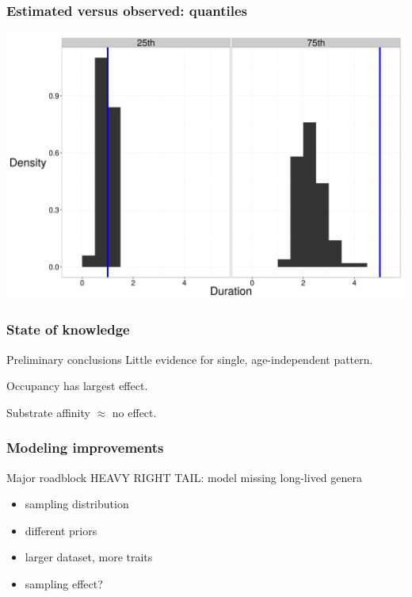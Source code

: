 \documentclass{beamer}
\begin{document}
\begin{frame}
  \frametitle{Estimated versus observed: quantiles}
  \begin{center}
    \includegraphics[height = 0.8\textheight, width = \textwidth, keepaspectratio = true]{figure/wei_quant_ppc}
  \end{center}
\end{frame}

\begin{frame}
  \frametitle{State of knowledge}

  \begin{block}{Preliminary conclusions}
    Little evidence for single, age-independent pattern.

    Occupancy has largest effect. 
    
    Substrate affinity \(\approx\) no effect.
  \end{block}
\end{frame}

\begin{frame}
  \frametitle{Modeling improvements}

  \begin{alertblock}{Major roadblock}
    \alert{\uppercase{heavy right tail}}: model missing long-lived genera
  \end{alertblock}

  \bigskip

  \begin{itemize}
    \item sampling distribution
    \item different priors
    \item larger dataset, more traits
    \item sampling effect?
  \end{itemize}
\end{frame}
\end{document}
